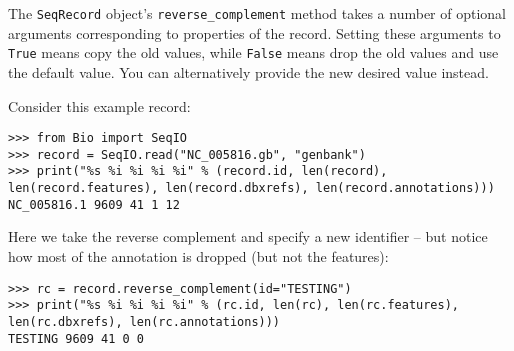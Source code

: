 The \verb|SeqRecord| object's \verb|reverse_complement| method takes a number
of optional arguments corresponding to properties of the record. Setting these
arguments to \verb|True| means copy the old values, while \verb|False| means
drop the old values and use the default value. You can alternatively provide
the new desired value instead.

Consider this example record:

\begin{verbatim}
>>> from Bio import SeqIO
>>> record = SeqIO.read("NC_005816.gb", "genbank")
>>> print("%s %i %i %i %i" % (record.id, len(record), len(record.features), len(record.dbxrefs), len(record.annotations)))
NC_005816.1 9609 41 1 12
\end{verbatim}

Here we take the reverse complement and specify a new identifier -- but notice
how most of the annotation is dropped (but not the features):

\begin{verbatim}
>>> rc = record.reverse_complement(id="TESTING")
>>> print("%s %i %i %i %i" % (rc.id, len(rc), len(rc.features), len(rc.dbxrefs), len(rc.annotations)))
TESTING 9609 41 0 0
\end{verbatim}

